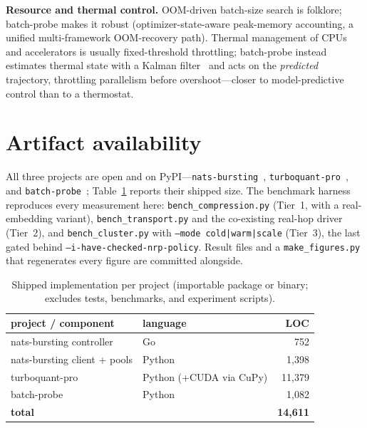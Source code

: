 \documentclass[conference]{IEEEtran}
\begin{document}
\textbf{Resource and thermal control.} OOM-driven batch-size search is folklore; batch-probe makes
it robust (optimizer-state-aware peak-memory accounting, a unified multi-framework OOM-recovery
path). Thermal management of CPUs and accelerators is usually fixed-threshold throttling;
batch-probe instead estimates thermal state with a Kalman filter~\cite{kalman} and acts on the
\emph{predicted} trajectory, throttling parallelism before overshoot---closer to model-predictive
control than to a thermostat.

\section{Artifact availability}\label{sec:artifact}
All three projects are open and on PyPI---\texttt{nats-bursting}~\cite{natsbursting},
\texttt{turboquant-pro}~\cite{turboquantpro}, and \texttt{batch-probe}~\cite{batchprobe};
Table~\ref{tab:impl} reports their shipped size. The benchmark harness
reproduces every measurement here:
\texttt{bench\_compression.py} (Tier~1, with a real-embedding variant), \texttt{bench\_transport.py}
and the co-existing real-hop driver (Tier~2), and \texttt{bench\_cluster.py} with
\texttt{--mode cold|warm|scale} (Tier~3), the last gated behind \texttt{--i-have-checked-nrp-policy}.
Result files and a \texttt{make\_figures.py} that regenerates every figure are committed alongside.

\begin{table}[t]\centering\caption{Shipped implementation per project (importable package or
binary; excludes tests, benchmarks, and experiment scripts).}\label{tab:impl}
\begin{tabular}{llr}\toprule
project / component & language & LOC \\\midrule
nats-bursting controller & Go & 752 \\
nats-bursting client + pools & Python & 1{,}398 \\
turboquant-pro & Python (+CUDA via CuPy) & 11{,}379 \\
batch-probe & Python & 1{,}082 \\\midrule
\textbf{total} & & \textbf{14{,}611} \\\bottomrule
\end{tabular}
\end{table}
\end{document}
